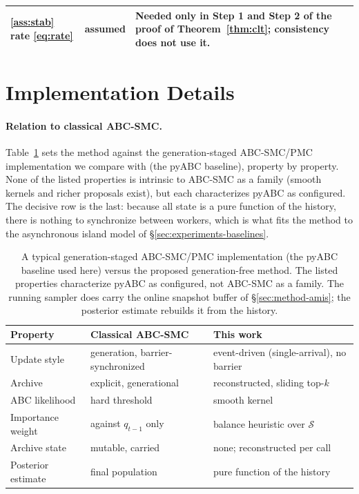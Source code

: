 \documentclass[10pt]{article}
\theoremstyle{plain}
\theoremstyle{definition}
\begin{document}
\begin{table}[h]
\begin{tabular}{@{}p{}p{}p{}@{}}
\ref{ass:stab} rate \eqref{eq:rate} & assumed & Needed only in Step 1 and Step 2 of the proof of Theorem~\ref{thm:clt}; consistency does not use it. \\
\bottomrule
\end{tabular}
\end{table}

\section{Implementation Details}\label{app:implementation}

\paragraph{Relation to classical ABC-SMC.}\label{sec:method-comparison}
Table~\ref{tab:method-comparison} sets the method against the generation-staged ABC-SMC/PMC implementation we compare with (the pyABC baseline), property by property. None of the listed properties is intrinsic to ABC-SMC as a family (smooth kernels and richer proposals exist), but each characterizes pyABC as configured. The decisive row is the last: because all state is a pure function of the history, there is nothing to synchronize between workers, which is what fits the method to the asynchronous island model of \S\ref{sec:experiments-baselines}.
\begin{table}[h]
\caption{A typical generation-staged ABC-SMC/PMC implementation (the pyABC baseline used here) versus the proposed generation-free method. The listed properties characterize pyABC as configured, not ABC-SMC as a family. The running sampler does carry the online snapshot buffer of \S\ref{sec:method-amis}; the posterior estimate rebuilds it from the history.}\label{tab:method-comparison}
\centering
\begin{tabular}{@{}lll@{}}
\toprule
Property & Classical ABC-SMC & This work \\
\midrule
Update style & generation, barrier-synchronized & event-driven (single-arrival), no barrier \\
Archive & explicit, generational & reconstructed, sliding top-$k$ \\
ABC likelihood & hard threshold & smooth kernel \\
Importance weight & against $q_{t-1}$ only & balance heuristic over $\mathcal{S}$ \\
Archive state & mutable, carried & none; reconstructed per call \\
Posterior estimate & final population & pure function of the history \\
\bottomrule
\end{tabular}
\end{table}
\end{document}
